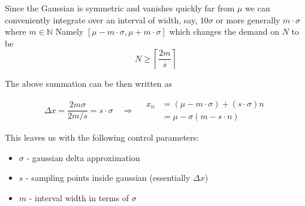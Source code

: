 Since the Gaussian is symmetric and vanishes quickly far from $\mu$ we can conveniently integrate over an interval of width, say, $10\sigma$ or more generally $m\cdot\sigma$ where $m \in\mathbb{N}$ Namely $[\mu-m\cdot\sigma, \mu+m\cdot\sigma]$ which changes the demand on $N$ to be
\begin{equation}
N\geq \left\lceil\frac{2m}{s} \right\rceil
\label{eq:delta_sampling_condition_m}
\end{equation}

The above summation can be then written as

\begin{equation}
\Delta x = \frac{2m\sigma}{2m/s} = s\cdot\sigma \quad\Rightarrow\quad \begin{aligned}
x_{n} &= (\mu-m\cdot\sigma)+  (s\cdot\sigma)n \\
&= \mu - \sigma(m-s\cdot n)
\end{aligned}
\label{eq:delta_xn_expression}
\end{equation}

This leaves us with the following control parameters:
\begin{itemize}
  \item $\sigma$ - gaussian delta approximation
  \item $s$ - sampling points inside gaussian (essentially $\Delta x$)
  \item $m$ - interval width in terms of $\sigma$
\end{itemize}

